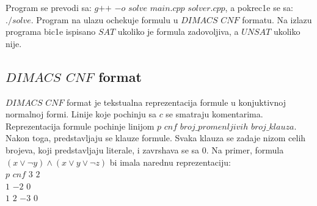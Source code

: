 \documentclass[a4paper,titlepage,12pt]{article}
\begin{document}
Program se prevodi sa: $g$$+$$+$ $-o$ $solve$ $main.cpp$ $solver.cpp$, a pokrec1e se sa: $./solve$. Program na ulazu ochekuje formulu u $DIMACS$ $CNF$ formatu. Na izlazu programa bic1e ispisano $SAT$ ukoliko je formula zadovoljiva, a $UNSAT$ ukoliko nije.

\subsection{$DIMACS$ $CNF$ format}

$DIMACS$ $CNF$ format je tekstualna reprezentacija formule u kon\-juktivnoj normalnoj formi. Linije koje pochinju sa $c$ se smatraju komentarima. Reprezentacija formule pochinje linijom $p$ $cnf$ $broj\_promenljivih$ $broj\_klauza$. Nakon toga, predstavljaju se klauze formule. Svaka klauza se zadaje nizom celih brojeva, koji predstavljaju literale, i zavrshava se sa $0$. Na primer, formula $(x \vee \neg y) \wedge (x \vee y \vee \neg z)$ bi imala narednu reprezentaciju:\\

$p$ $cnf$ $3$ $2$\\
\indent $1$ $-2$ $0$\\
\indent $1$ $2$ $-3$ $0$
\end{document}
